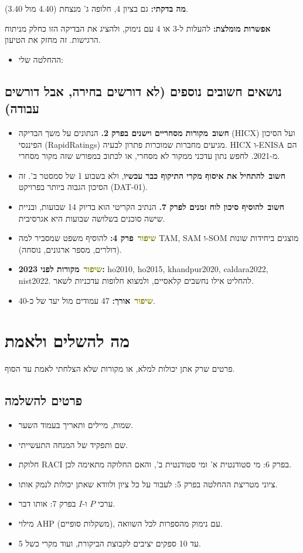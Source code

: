 \documentclass[11pt,a4paper]{article}
\newcommand{\en}[1]{\foreignlanguage{english}{#1}}
\newcommand{\cb}{\framebox[1.7ex]{\rule{0pt}{1.3ex}}}
\newenvironment{checks}{\begin{itemize}\renewcommand{\labelitemi}{\cb}}{\end{itemize}}
\newcommand{\imp}{\textcolor{orange!80!black}{\textbf{חשוב}}}
\newcommand{\nice}{\textcolor{olive}{\textbf{שיפור}}}
\begin{document}
\textbf{מה בדקתי:} גם בציון 4, חלופה ג' מנצחת (4.40 מול 3.40).

\textbf{אפשרות מומלצת:} להעלות ל-3 או 4 עם נימוק, ולהציג את הבדיקה הזו כחלק מניתוח הרגישות. זה מחזק את הטיעון.

\begin{checks}
\item ההחלטה שלי: \underline{\hspace{8cm}}
\end{checks}

\subsection*{נושאים חשובים נוספים (לא דורשים בחירה, אבל דורשים עבודה)}
\begin{checks}
\item \imp\ \textbf{מקורות מסחריים וישנים בפרק 2.} הנתונים על משך הבדיקה (\en{HICX}) ועל הסיכון הפיננסי (\en{RapidRatings}) מגיעים מחברות שמוכרות פתרון לבעיה. \en{HICX} ו-\en{ENISA} הם מ-2021. לחפש נתון עדכני ממקור לא מסחרי, או לכתוב במפורש שזה מקור מסחרי.
\item \imp\ \textbf{להתחיל את איסוף מקרי התיקוף כבר עכשיו}, ולא בשבוע 1 של סמסטר ב'. זה הסיכון הגבוה ביותר בפרויקט (\en{DAT-01}).
\item \imp\ \textbf{להוסיף סיכון לוח זמנים לפרק 7.} הנתיב הקריטי הוא בדיוק 14 שבועות, ובניית שישה סוכנים בשלושה שבועות היא אגרסיבית.
\item \nice\ \textbf{פרק 4:} להוסיף משפט שמסביר למה \en{TAM}, \en{SAM} ו-\en{SOM} מוצגים ביחידות שונות (דולרים, מספר ארגונים, נוסחה).
\item \nice\ \textbf{מקורות לפני 2023:} \en{ho2010}, \en{ho2015}, \en{khandpur2020}, \en{caldara2022}, \en{nist2022}. להחליט אילו נחשבים קלאסיים, ולמצוא חלופות עדכניות לשאר.
\item \nice\ \textbf{אורך:} 47 עמודים מול יעד של כ-40.
\end{checks}

\section{מה להשלים ולאמת}
פרטים שרק אתן יכולות למלא, או מקורות שלא הצלחתי לאמת עד הסוף.

\subsection*{פרטים להשלמה}
\begin{checks}
\item שמות, מיילים ותאריך בעמוד השער.
\item שם ותפקיד של המנחה התעשייתי.
\item חלוקת \en{RACI} בפרק 6: מי סטודנטית א' ומי סטודנטית ב', והאם החלוקה מתאימה לכן.
\item ציוני מטריצת ההחלטה בפרק 5: לעבור על כל ציון ולוודא שאתן יכולות לנמק אותו.
\item ערכי $P$ ו-$I$ בפרק 7: אותו דבר.
\item מילוי \en{AHP} (משקלות סופיים), עם נימוק מהספרות לכל השוואה.
\item 5 עד 10 ספקים יציבים לקבוצת הביקורת, ועוד מקרי כשל.
\end{checks}
\end{document}
